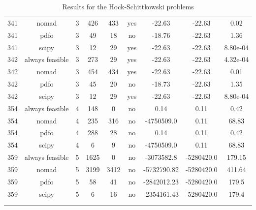 \begin{footnotesize}
\begin{center}
\begin{longtable}{ccccccccc}
341 &           nomad &  3 &    426 &    433 &     yes &      -22.63 &      -22.63 &     0.02\\
341 &            pdfo &  3 &     49 &     18 &      no &      -18.76 &      -22.63 &     1.36\\
341 &           scipy &  3 &     12 &     29 &     yes &      -22.63 &      -22.63 & 8.80e-04\\
342 & always feasible &  3 &    273 &     29 &     yes &      -22.63 &      -22.63 & 4.32e-04\\
342 &           nomad &  3 &    454 &    434 &     yes &      -22.63 &      -22.63 &     0.01\\
342 &            pdfo &  3 &     45 &     20 &      no &      -18.73 &      -22.63 &     1.35\\
342 &           scipy &  3 &     12 &     29 &     yes &      -22.63 &      -22.63 & 8.80e-04\\
354 & always feasible &  4 &    148 &      0 &      no &        0.14 &        0.11 &     0.42\\
354 &           nomad &  4 &    235 &    316 &      no &  -4750509.0 &        0.11 &    68.83\\
354 &            pdfo &  4 &    288 &     28 &      no &        0.14 &        0.11 &     0.42\\
354 &           scipy &  4 &      6 &      9 &      no &  -4750509.0 &        0.11 &    68.83\\
359 & always feasible &  5 &   1625 &      0 &      no &  -3073582.8 &  -5280420.0 &   179.15\\
359 &           nomad &  5 &   3199 &   3412 &      no & -5732790.82 &  -5280420.0 &   411.64\\
359 &            pdfo &  5 &     58 &     41 &      no & -2842012.23 &  -5280420.0 &    179.5\\
359 &           scipy &  5 &      6 &     16 &      no & -2354161.43 &  -5280420.0 &    179.4\\
\caption{Results for the Hock-Schittkowski problems} \\
\label{nonlinear_results}
\end{longtable}
\end{center}
\end{footnotesize}




